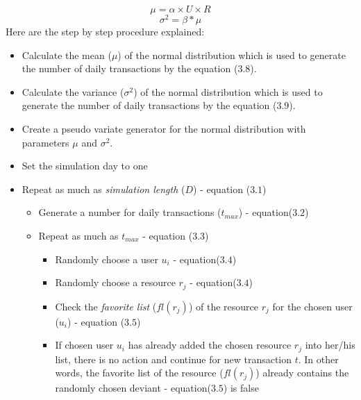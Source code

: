 \documentclass[12pt,a4paper]{report}
\begin{document}
	\begin{equation}
	\mu = \alpha \times U \times R
	\end{equation}
	\begin{equation}
	\sigma^2 =  \beta * \mu 
	\end{equation}
	Here are the step by step procedure explained: 

\begin{itemize}

\item Calculate the mean ($\mu$) of the normal distribution which is used to generate the number of daily transactions by the equation ($3.8$).

\item Calculate the variance ($\sigma^2$) of the normal distribution which is used to generate the number of daily transactions by the equation ($3.9$).

\item Create a pseudo variate generator for the normal distribution with parameters $\mu$ and $\sigma^2$.

\item Set the simulation day to one

\item Repeat as much as \emph{simulation length} ($D$) - equation ($3.1$)

	\begin{itemize}

	\item Generate a number for daily transactions ($t_{max}$) - equation($3.2$)

	\item Repeat as much as $t_{max}$ - equation ($3.3$)

		\begin{itemize}

		\item Randomly choose a user $u_{i}$ - equation($3.4$)

		\item Randomly choose a resource $r_{j}$ - equation($3.4$) 

		\item Check the \emph{favorite list} ($fl(r_{j})$) of the resource $r_{j}$ for the chosen user ($u_{i}$) - equation ($3.5$)

		\item If chosen user $u_{i}$ has already added the chosen resource $r_{j}$ into her/his list, there is no action and continue for new transaction $t$. In other words, the {favorite list} of the resource ($fl(r_{j})$)  already contains the randomly chosen deviant - equation($3.5$) is false


\end{itemize}
\end{itemize}
\end{itemize}
\end{document}

